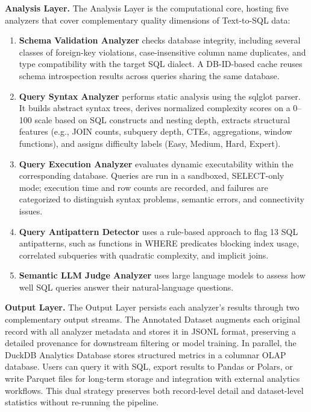 \documentclass[print]{einformatica}
\begin{document}
\textbf{Analysis Layer.} The Analysis Layer is the computational core, hosting five analyzers that cover complementary quality dimensions of Text-to-SQL data:

\begin{enumerate}
\item \textbf{Schema Validation Analyzer} checks database integrity, including several classes of foreign-key violations, case-insensitive column name duplicates, and type compatibility with the target SQL dialect. A DB-ID-based cache reuses schema introspection results across queries sharing the same database.

\item \textbf{Query Syntax Analyzer} performs static analysis using the sqlglot parser. It builds abstract syntax trees, derives normalized complexity scores on a 0--100 scale based on SQL constructs and nesting depth, extracts structural features (e.g., JOIN counts, subquery depth, CTEs, aggregations, window functions), and assigns difficulty labels (Easy, Medium, Hard, Expert).

\item \textbf{Query Execution Analyzer} evaluates dynamic executability within the corresponding database. Queries are run in a sandboxed, SELECT-only mode; execution time and row counts are recorded, and failures are categorized to distinguish syntax problems, semantic errors, and connectivity issues.

\item \textbf{Query Antipattern Detector} uses a rule-based approach to flag 13 SQL antipatterns, such as functions in WHERE predicates blocking index usage, correlated subqueries with quadratic complexity, and implicit joins.

\item \textbf{Semantic LLM Judge Analyzer} uses large language models to assess how well SQL queries answer their natural-language questions. 
\end{enumerate}

\textbf{Output Layer.} The Output Layer persists each analyzer's results through two complementary output streams. The Annotated Dataset augments each original record with all analyzer metadata and stores it in JSONL format, preserving a detailed provenance for downstream filtering or model training. In parallel, the DuckDB Analytics Database stores structured metrics in a columnar OLAP database. Users can query it with SQL, export results to Pandas or Polars, or write Parquet files for long-term storage and integration with external analytics workflows. This dual strategy preserves both record-level detail and dataset-level statistics without re-running the pipeline.
\end{document}
